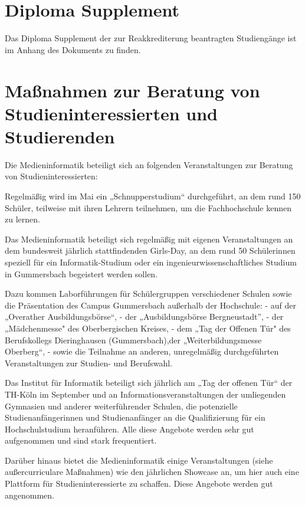 \section{Diploma Supplement}\label{diploma-supplement}

Das Diploma Supplement der zur Reakkrediterung beantragten Studiengänge
ist im Anhang des Dokuments zu finden.

\section{Maßnahmen zur Beratung von Studieninteressierten und
Studierenden}\label{mauxdfnahmen-zur-beratung-von-studieninteressierten-und-studierenden}

Die Medieninformatik beteiligt sich an folgenden Veranstaltungen zur
Beratung von Studieninteressierten:

Regelmäßig wird im Mai ein „Schnupperstudium`` durchgeführt, an dem rund
150 Schüler, teilweise mit ihren Lehrern teilnehmen, um die
Fachhochschule kennen zu lernen.

Das Medieninformatik beteiligt sich regelmäßig mit eigenen
Veranstaltungen an dem bundesweit jährlich stattfindenden Girls-Day, an
dem rund 50 Schülerinnen speziell für ein Informatik-Studium oder ein
ingenieurwissenschaftliches Studium in Gummersbach begeistert werden
sollen.

Dazu kommen Laborführungen für Schülergruppen verschiedener Schulen
sowie die Präsentation des Campus Gummersbach außerhalb der Hochschule:
- auf der „Overather Ausbildungsbörse``, - der „Ausbildungsbörse
Bergneustadt'', - der „Mädchenmesse" des Oberbergischen Kreises, - dem
„Tag der Offenen Tür" des Berufskollegs Dieringhausen (Gummersbach),der
„Weiterbildungsmesse Oberberg``, - sowie die Teilnahme an anderen,
unregelmäßig durchgeführten Veranstaltungen zur Studien- und Berufswahl.

Das Institut für Informatik beteiligt sich jährlich am „Tag der offenen
Tür`` der TH-Köln im September und an Informationsveranstaltungen der
umliegenden Gymnasien und anderer weiterführender Schulen, die
potenzielle Studienanfängerinnen und Studienanfänger an die
Qualifizierung für ein Hochschulstudium heranführen. Alle diese Angebote
werden sehr gut aufgenommen und sind stark frequentiert.

Darüber hinaus bietet die Medieninformatik einige Veranstaltungen (siehe
außercurriculare Maßnahmen) wie den jährlichen Showcase an, um hier auch
eine Plattform für Studieninteressierte zu schaffen. Diese Angebote
werden gut angenommen.

